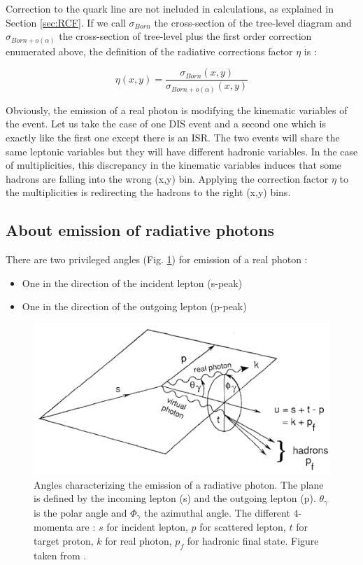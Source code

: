 Correction to the quark line are not included in calculations, as explained in Section \ref{sec:RCF}. If we call $\sigma_{Born}$ the cross-section of the tree-level diagram and $\sigma_{Born+o(\alpha)}$ the cross-section of tree-level plus the first order correction enumerated above, the definition of the radiative corrections factor $\eta$ is :

\begin{equation} \label{eq:RCF_def}
  \eta(x,y)=\frac{\sigma_{Born}(x,y)}{\sigma_{Born+o(\alpha)}(x,y)}
\end{equation}

Obviously, the emission of a real photon is modifying the kinematic variables of the event. Let us take the case of one DIS event and a second one which is exactly like the first one except there is an ISR. The two events will share the same leptonic variables but they will have different hadronic variables. In the case of multiplicities, this discrepancy in the kinematic variables induces that some hadrons are falling into the wrong (x,y) bin. Applying the correction factor $\eta$ to the multiplicities is redirecting the hadrons to the right (x,y) bins.

\subsection{About emission of radiative photons}

There are two privileged angles (Fig. \ref{fig:plan}) for emission of a real photon :
\begin{itemize}
\item One in the direction of the incident lepton (s-peak)
\item One in the direction of the outgoing lepton (p-peak)
\end{itemize}

\begin{figure}[h!]
\centering
\includegraphics[width=12cm]{gfx/plan_angle.png}
\caption{Angles characterizing the emission of a radiative photon. The plane is defined by the incoming lepton (s) and the outgoing lepton (p). $\theta_\gamma$ is the polar angle and $\Phi_\gamma$ the azimuthal angle. The different $4$-momenta are : $s$ for incident lepton, $p$ for scattered lepton, $t$ for target proton, $k$ for real photon, $p_f$ for hadronic final state. Figure taken from \cite{TERAD2}.}
\label{fig:plan}
\end{figure}

